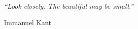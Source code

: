 \documentclass[a4paper, 11pt, twoside]{Thesis}  %
\begin{document}
%
%
%
%
%
%
%
%
%
%
%
\clearpage  %

\pagestyle{empty}  %

\null\vfill
\textit{``Look closely. The beautiful may be small.''}

\begin{flushright}
Immanuel Kant
\end{flushright}

\vfill\vfill\vfill\vfill\vfill\vfill\null
\clearpage  %
\end{document}
